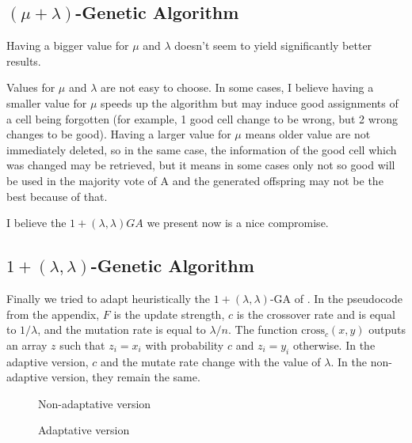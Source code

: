 \documentclass[12pt]{article}
\theoremstyle{definition}
\theoremstyle{plain}
\theoremstyle{remark}
\begin{document}
\subsection{$(\mu +\lambda)$-Genetic Algorithm}


Having a bigger value for $\mu$ and $\lambda$ doesn't seem to yield significantly better results.

Values for $\mu$ and $\lambda$ are not easy to choose. In some cases, I believe having a smaller value for $\mu$ speeds up the algorithm but may induce good assignments of a cell being forgotten (for example, 1 good cell change to be wrong, but 2 wrong changes to be good). Having a larger value for $\mu$ means older value are not immediately deleted, so in the same case, the information of the good cell which was changed may be retrieved, but it means in some cases only not so good will be used in the majority vote of A and the generated offspring may not be the best because of that.

I believe the $1 + (\lambda, \lambda)GA$ we present now is a nice compromise.

\subsection{$1 + (\lambda, \lambda)$-Genetic Algorithm}
Finally we tried to adapt heuristically the $1 + (\lambda, \lambda)$-GA of \cite{DOERRDOERR}. In the pseudocode
from the appendix, $F$ is the update strength, $c$ is the crossover rate and is equal to $1/\lambda$,
and the mutation rate is equal to $\lambda/n$. The function $\text{cross}_c(x, y)$ outputs an array $z$ such that 
$z_i = x_i$ with probability $c$ and $z_i = y_i$ otherwise. In the adaptive version, $c$ and the mutate rate
change with the value of $\lambda$. In the non-adaptive version, they remain the same.

\begin{figure}[h]
    \caption{Non-adaptative version}
\end{figure}

\begin{figure}[h]
    \caption{Adaptative version}
\end{figure}
\end{document}
